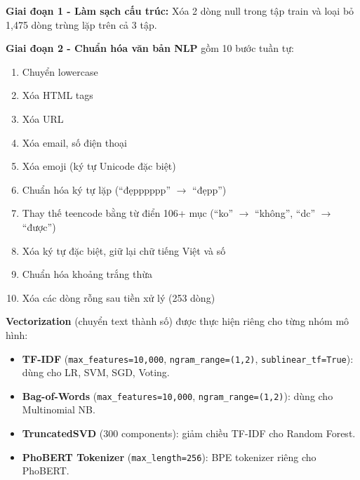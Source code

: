 \textbf{Giai đoạn 1 - Làm sạch cấu trúc:} Xóa 2 dòng null trong tập train và loại bỏ 1{,}475 dòng trùng lặp trên cả 3 tập.

\textbf{Giai đoạn 2 - Chuẩn hóa văn bản NLP} gồm 10 bước tuần tự:
\begin{enumerate}
    \item Chuyển lowercase
    \item Xóa HTML tags
    \item Xóa URL
    \item Xóa email, số điện thoại
    \item Xóa emoji (ký tự Unicode đặc biệt)
    \item Chuẩn hóa ký tự lặp (``đẹpppppp'' $\rightarrow$ ``đẹpp'')
    \item Thay thế teencode bằng từ điển 106+ mục (``ko'' $\rightarrow$ ``không'', ``dc'' $\rightarrow$ ``được'')
    \item Xóa ký tự đặc biệt, giữ lại chữ tiếng Việt và số
    \item Chuẩn hóa khoảng trắng thừa
    \item Xóa các dòng rỗng sau tiền xử lý (253 dòng)
\end{enumerate}

\textbf{Vectorization} (chuyển text thành số) được thực hiện riêng cho từng nhóm mô hình:
\begin{itemize}
    \item \textbf{TF-IDF} (\texttt{max\_features=10{,}000}, \texttt{ngram\_range=(1,2)}, \texttt{sublinear\_tf=True}): dùng cho LR, SVM, SGD, Voting.
    \item \textbf{Bag-of-Words} (\texttt{max\_features=10{,}000}, \texttt{ngram\_range=(1,2)}): dùng cho Multinomial NB.
    \item \textbf{TruncatedSVD} (300 components): giảm chiều TF-IDF cho Random Forest.
    \item \textbf{PhoBERT Tokenizer} (\texttt{max\_length=256}): BPE tokenizer riêng cho PhoBERT.
\end{itemize}
